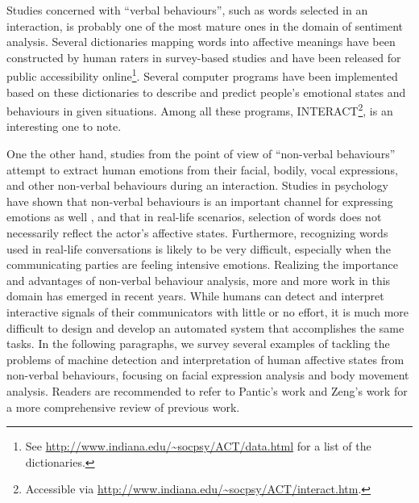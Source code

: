 Studies concerned with ``verbal behaviours'', such as words selected in an interaction, is probably one of the most mature ones in the domain of sentiment analysis. Several dictionaries mapping words into affective meanings have been constructed by human raters in survey-based studies and have been released for public accessibility online\footnote{See \url{http://www.indiana.edu/~socpsy/ACT/data.html} for a list of the dictionaries.}. Several computer programs have been implemented based on these dictionaries to describe and predict people's emotional states and behaviours in given situations. Among all these programs, INTERACT\footnote{Accessible via \url{http://www.indiana.edu/~socpsy/ACT/interact.htm}.}, is an interesting one to note.

One the other hand, studies from the point of view of ``non-verbal behaviours'' attempt to extract human emotions from their facial, bodily, vocal expressions, and other non-verbal behaviours during an interaction. Studies in psychology have shown that non-verbal behaviours is an important channel for expressing emotions as well \cite{schroder2013culture}, and that in real-life scenarios, selection of words does not necessarily reflect the actor's affective states. Furthermore, recognizing words used in real-life conversations is likely to be very difficult, especially when the communicating parties are feeling intensive emotions. Realizing the importance and advantages of non-verbal behaviour analysis, more and more work in this domain has emerged in recent years. While humans can detect and interpret interactive signals of their communicators with little or no effort, it is much more difficult to design and develop an automated system that accomplishes the same tasks. In the following paragraphs, we survey several examples of tackling the problems of machine detection and interpretation of human affective states from non-verbal behaviours, focusing on facial expression analysis and body movement analysis. Readers are recommended to refer to Pantic's work \cite{pantic2003toward} and Zeng's work \cite{zeng2009survey} for a more comprehensive review of previous work.

